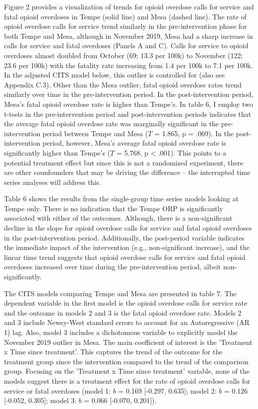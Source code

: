 Figure 2 provides a visualization of trends for opioid overdose calls for service and fatal opioid overdoses in Tempe (solid line) and Mesa (dashed line). The rate of opioid overdose calls for service trend similarly in the pre-intervention phase for both Tempe and Mesa, although in November 2019, Mesa had a sharp increase in calls for service and fatal overdoses (Panels A and C). Calls for service to opioid overdoses almost doubled from October (69; 13.3 per 100k) to November (122; 23.6 per 100k) with the fatality rate increasing from 1.4 per 100k to 7.1 per 100k. In the adjusted CITS model below, this outlier is controlled for (also see Appendix C.3). Other than the Mesa outlier, fatal opioid overdose rates trend similarly over time in the pre-intervention period. In the post-intervention period, Mesa's fatal opioid overdose rate is higher than Tempe's. In table 6, I employ two t-tests in the pre-intervention period and post-intervention periods indicates that the average fatal opioid overdose rate was marginally significant in the pre-intervention period between Tempe and Mesa (\(T\) = 1.865, p = .069). In the post-intervention period, however, Mesa's average fatal opioid overdose rate is significantly higher than Tempe's (\(T\) = 5.768, p < .001). This points to a potential treatment effect but since this is not a randomized experiment, there are other counfounders that may be driving the difference -- the interrupted time series analyses will address this.

Table 6 shows the results from the single-group time series models looking at Tempe only. There is no indication that the Tempe ORP is significantly associated with either of the outcomes. Although, there is a non-significant decline in the slope for opioid overdose calls for service and fatal opioid overdoses in the post-intervention period. Additionally, the post-period variable indicates the immediate impact of the intervention (e.g., non-significant increase), and the linear time trend suggests that opioid overdose calls for service and fatal opioid overdoses increased over time during the pre-intervention period, albeit non-significantly. 

The CITS models comparing Tempe and Mesa are presented in table 7. The dependent variable in the first model is the opioid overdose calls for service rate and the outcome in models 2 and 3 is the fatal opioid overdose rate. Models 2 and 3 include Newey-West standard errors to account for an Autoregressive (AR 1) lag. Also, model 3 includes a dichotomous variable to explicitly model the November 2019 outlier in Mesa. The main coefficient of interest is the 'Treatment x Time since treatment'. This captures the trend of the outcome for the treatment group since the intervention compared to the trend of the comparison group. Focusing on the 'Treatment x Time since treatment' variable, none of the models suggest there is a treatment effect for the rate of opioid overdose calls for service or fatal overdoses (model 1: \(b\) = 0.169 [-0.297, 0.635]; model 2: \(b\) = 0.126 [-0.052, 0.305]; model 3: \(b\) = 0.066 [-0.070, 0.201]). 

